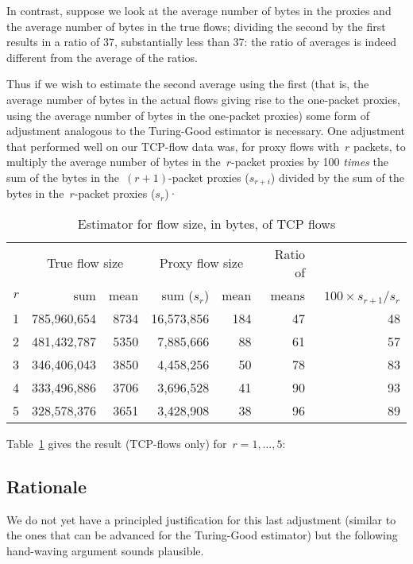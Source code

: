 \documentclass{paper}
\begin{document}
In contrast, suppose we look at the average number of bytes in the proxies and
the average number of bytes in the true flows; dividing the second by the first
results in a ratio of 37, substantially less than 37: the ratio of averages is
indeed different from the average of the ratios.

Thus if we wish to estimate the second average using the first (that is, the
average number of bytes in the actual flows giving rise to the one-packet
proxies, using the average number of bytes in the one-packet proxies) some form
of adjustment analogous to the Turing-Good estimator is necessary. One
adjustment that performed well on our TCP-flow data was, for proxy flows
with~$r$ packets, to multiply the average number of bytes in the~$r$-packet
proxies by 100 \emph{times} the sum of the bytes in the~$(r + 1)$-packet proxies
($s_{r+i}$) divided by the sum of the bytes in the~$r$-packet proxies ($s_r$)·

\begin{table}
\begin{center}
\begin{tabular}{r@{\hskip 1.7em}r r@{\hskip 1.7em}r r@{\hskip 1.7em}r r}
    & \multicolumn{2}{c}{True flow size} & \multicolumn{2}{c}{Proxy flow size} & Ratio of & \\
$r$ & sum & mean & sum ($s_r$) & mean & means &~$100 \times s_{r+1}/s_r$ \\
\midrule
1 & 785,960,654 & 8734 & 16,573,856 & 184 & 47 & 48 \\
2 & 481,432,787 & 5350 &  7,885,666 &  88 & 61 & 57 \\
3 & 346,406,043 & 3850 &  4,458,256 &  50 & 78 & 83 \\
4 & 333,496,886 & 3706 &  3,696,528 &  41 & 90 & 93 \\
5 & 328,578,376 & 3651 &  3,428,908 &  38 & 96 & 89 \\
\end{tabular}
\caption{Estimator for flow size, in bytes, of TCP flows}
\label{size_est}
\end{center}
\end{table}

Table~\ref{size_est} gives the result (TCP-flows only) for~$r = 1, \dots, 5$:

\subsection{Rationale}

We do not yet have a principled justification for this last adjustment (similar
to the ones that can be advanced for the Turing-Good estimator) but the
following hand-waving argument sounds plausible.
\end{document}
